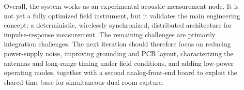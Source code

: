 Overall, the system works as an experimental acoustic measurement node. It is not yet a fully optimized field instrument, but it validates the main engineering concept: a deterministic, wirelessly synchronized, distributed architecture for impulse-response measurement. The remaining challenges are primarily integration challenges. The next iteration should therefore focus on reducing power-supply noise, improving grounding and PCB layout, characterizing the antennas and long-range timing under field conditions, and adding low-power operating modes, together with a second analog-front-end board to exploit the shared time base for simultaneous dual-room capture.
